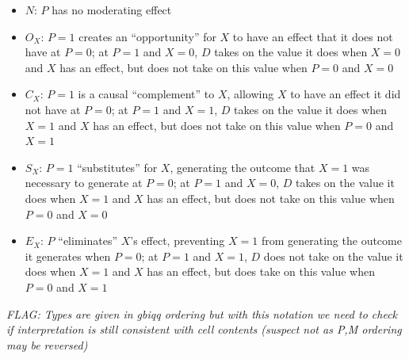 \documentclass[
  12pt,
]{book}
\begin{document}
\begin{itemize}
\item
  \(N\): \(P\) has no moderating effect
\item
  \(O_X\): \(P=1\) creates an ``opportunity'' for \(X\) to have an effect that it does not have at \(P=0\); at \(P=1\) and \(X=0\), \(D\) takes on the value it does when \(X=0\) and \(X\) has an effect, but does not take on this value when \(P=0\) and \(X=0\)
\item
  \(C_X\): \(P=1\) is a causal ``complement'' to \(X\), allowing \(X\) to have an effect it did not have at \(P=0\); at \(P=1\) and \(X=1\), \(D\) takes on the value it does when \(X=1\) and \(X\) has an effect, but does not take on this value when \(P=0\) and \(X=1\)
\item
  \(S_X\): \(P=1\) ``substitutes'' for \(X\), generating the outcome that \(X=1\) was necessary to generate at \(P=0\); at \(P=1\) and \(X=0\), \(D\) takes on the value it does when \(X=1\) and \(X\) has an effect, but does not take on this value when \(P=0\) and \(X=0\)
\item
  \(E_X\): \(P\) ``eliminates'' \(X\)'s effect, preventing \(X=1\) from generating the outcome it generates when \(P=0\); at \(P=1\) and \(X=1\), \(D\) does not take on the value it does when \(X=1\) and \(X\) has an effect, but does take on this value when \(P=0\) and \(X=1\)
\end{itemize}

\emph{FLAG: Types are given in gbiqq ordering but with this notation we need to check if interpretation is still consistent with cell contents (suspect not as P,M ordering may be reversed)}
\end{document}
